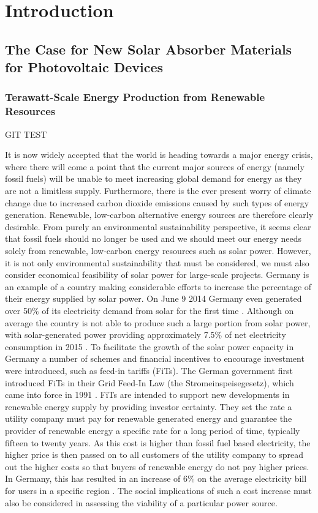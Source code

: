 \chapter{Introduction}

\section{The Case for New Solar Absorber Materials for Photovoltaic Devices}

\subsection{Terawatt-Scale Energy Production from Renewable Resources}

GIT TEST

It is now widely accepted that the world is heading towards a major energy crisis, where there will come a point that the current major sources of energy (namely fossil fuels) will be unable to meet increasing global demand for energy as they are not a limitless supply. Furthermore, there is the ever present worry of climate change due to increased carbon dioxide emissions caused by such types of energy generation. Renewable, low-carbon alternative energy sources are therefore clearly desirable. From purely an environmental sustainability perspective, it seems clear that fossil fuels should no longer be used and we should meet our energy needs solely from renewable, low-carbon energy resources such as solar power. However, it is not only environmental sustainability that must be considered, we must also consider economical feasibility of solar power for large-scale projects. Germany is an example of a country making considerable efforts to increase the percentage of their energy supplied by solar power. On June 9 2014 Germany even generated over 50\% of its electricity demand from solar for the first time \cite{Germany_guardian_news}. Although on average the country is not able to produce such a large portion from solar power, with solar-generated power providing approximately 7.5\% of net electricity consumption in 2015 \cite{Germany_PV}. To facilitate the growth of the solar power capacity in Germany a number of schemes and financial incentives to encourage investment were introduced, such as feed-in tariffs (FiTs).
The German government first introduced FiTs in their Grid Feed-In Law (the Stromeinspeisegesetz), which came into force in 1991 \cite{Germany_Lang}. FiTs are intended to support new developments in renewable energy supply by providing investor certainty. They set the rate a utility company must pay for renewable generated energy and guarantee the provider of renewable energy a specific rate for a long period of time, typically fifteen to twenty years. As this cost is higher than fossil fuel based electricity, the higher price is then passed on to all customers of the utility company to spread out the higher costs so that buyers of renewable energy do not pay higher prices. In Germany, this has resulted in an increase of 6\% on the average electricity bill for users in a specific region \cite{Germany_Oregon}. The social implications of such a cost increase must also be considered in assessing the viability of a particular power source.

